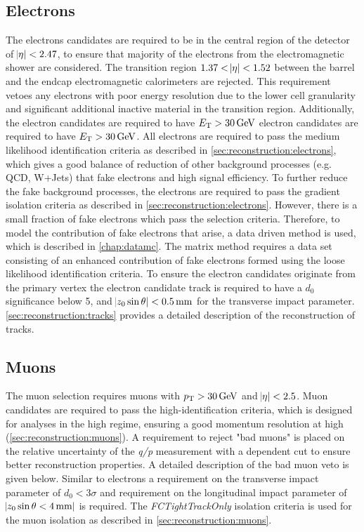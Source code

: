 \subsection{Electrons}\label{sec:selee}
The electrons candidates are required to be in the central region of the detector of $\abs{\eta} < 2.47$, to ensure that majority of the electrons from the electromagnetic shower are considered. The transition region $1.37 < \abs{\eta} < 1.52$ between the barrel and the endcap electromagnetic calorimeters are rejected. This requirement vetoes any electrons with poor energy resolution due to the lower cell granularity and significant additional inactive material in the transition region. Additionally, the electron candidates are required to have $E_{\text{T}} > \SI{30}{\giga\electronvolt}$ electron candidates are required to have $E_{\text{T}} > \SI{30}{\giga\electronvolt}$. All electrons are required to pass the medium likelihood identification criteria as described in \cref{sec:reconstruction:electrons}, which gives a good balance of reduction of other background processes (e.g. QCD, W+Jets) that fake electrons and high signal efficiency. To further reduce the fake background processes, the electrons are required to pass the gradient isolation criteria as described in \cref{sec:reconstruction:electrons}. However, there is a small fraction of fake electrons which pass the selection criteria. Therefore, to model the contribution of fake electrons that arise, a data driven method is used, which is described in \cref{chap:datamc}. The matrix method requires a data set consisting of an enhanced contribution of fake electrons formed using the loose likelihood identification criteria. To ensure the electron candidates originate from the primary vertex the electron candidate track is required to have a $d_0$ significance below 5, and $\abs{z_0 \sin\theta} < \SI{0.5}{\milli\meter}$ for the transverse impact parameter. \cref{sec:reconstruction:tracks} provides a detailed description of the reconstruction of tracks.

\subsection{Muons}\label{sec:selmm}
The muon selection requires muons with $p_{\text{T}} > \SI{30}{\giga\electronvolt}$ and $\abs{\eta} < 2.5$. Muon candidates are required to pass the high-\pt identification criteria, which is designed for analyses in the high \pt regime, ensuring a good momentum resolution at high \pt (\cref{sec:reconstruction:muons}). A requirement to reject "bad muons" is placed on the relative uncertainty of the \emph{q/p} measurement with a \pt dependent cut to ensure better reconstruction properties. A detailed description of the bad muon veto is given below. Similar to electrons a requirement on the transverse impact parameter of $d_0 < 3 \sigma$ and requirement on the longitudinal impact parameter of $\abs{z_0\sin\theta < \SI{4}{\milli\meter}}$ is required. The \emph{FCTightTrackOnly} isolation criteria is used for the muon isolation as described in \cref{sec:reconstruction:muons}.

